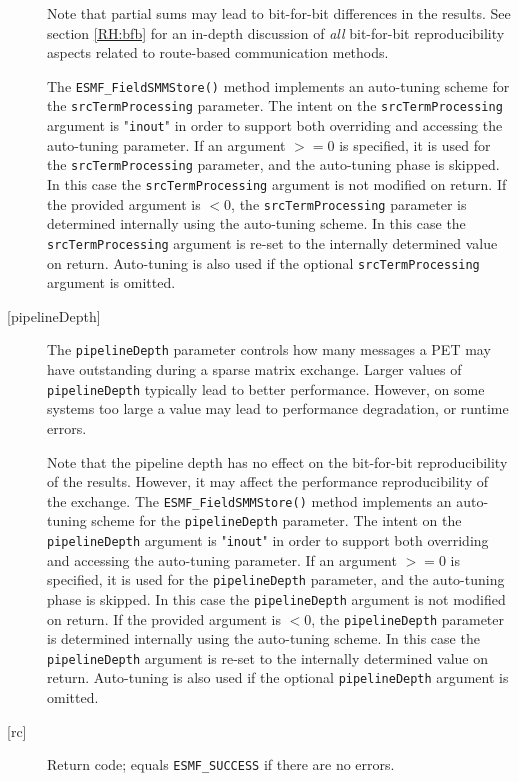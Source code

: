 \begin{description}
       Note that partial sums may lead to bit-for-bit differences in the results.
       See section \ref{RH:bfb} for an in-depth discussion of {\em all}
       bit-for-bit reproducibility aspects related to route-based communication
       methods.
  
       \begin{sloppypar}
       The {\tt ESMF\_FieldSMMStore()} method implements an auto-tuning scheme
       for the {\tt srcTermProcessing} parameter. The intent on the
       {\tt srcTermProcessing} argument is "{\tt inout}" in order to
       support both overriding and accessing the auto-tuning parameter.
       If an argument $>= 0$ is specified, it is used for the
       {\tt srcTermProcessing} parameter, and the auto-tuning phase is skipped.
       In this case the {\tt srcTermProcessing} argument is not modified on
       return. If the provided argument is $< 0$, the {\tt srcTermProcessing}
       parameter is determined internally using the auto-tuning scheme. In this
       case the {\tt srcTermProcessing} argument is re-set to the internally
       determined value on return. Auto-tuning is also used if the optional
       {\tt srcTermProcessing} argument is omitted.
       \end{sloppypar}
  
     \item [{[pipelineDepth]}]
       The {\tt pipelineDepth} parameter controls how many messages a PET
       may have outstanding during a sparse matrix exchange. Larger values
       of {\tt pipelineDepth} typically lead to better performance. However,
       on some systems too large a value may lead to performance degradation,
       or runtime errors.
  
       Note that the pipeline depth has no effect on the bit-for-bit
       reproducibility of the results. However, it may affect the performance
       reproducibility of the exchange.
       The {\tt ESMF\_FieldSMMStore()} method implements an auto-tuning scheme
       for the {\tt pipelineDepth} parameter. The intent on the
       {\tt pipelineDepth} argument is "{\tt inout}" in order to
       support both overriding and accessing the auto-tuning parameter.
       If an argument $>= 0$ is specified, it is used for the
       {\tt pipelineDepth} parameter, and the auto-tuning phase is skipped.
       In this case the {\tt pipelineDepth} argument is not modified on
       return. If the provided argument is $< 0$, the {\tt pipelineDepth}
       parameter is determined internally using the auto-tuning scheme. In this
       case the {\tt pipelineDepth} argument is re-set to the internally
       determined value on return. Auto-tuning is also used if the optional
       {\tt pipelineDepth} argument is omitted.
  
     \item [{[rc]}]
       Return code; equals {\tt ESMF\_SUCCESS} if there are no errors.
  
   \end{description}
  
\setlength{\parskip}{\oldparskip}
\setlength{\parindent}{\oldparindent}
\setlength{\baselineskip}{\oldbaselineskip}
